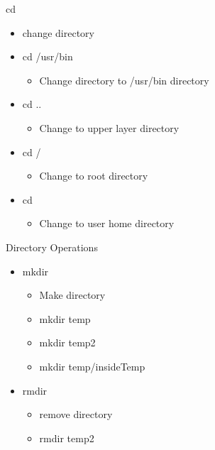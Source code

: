 \documentclass{beamer}
\begin{document}
\begin{frame}{cd}
\begin{itemize}
\item change directory
\item cd /usr/bin
\begin{itemize}
\item Change directory to /usr/bin directory
\end{itemize}
\item cd ..
\begin{itemize}
\item Change to upper layer directory
\end{itemize}
\item cd /
\begin{itemize}
\item Change to root directory
\end{itemize}
\item cd ~
\begin{itemize}
\item Change to user home directory
\end{itemize}
\end{itemize}
\end{frame}

\begin{frame}{Directory Operations}
\begin{itemize}
\item mkdir
\begin{itemize}
\item Make directory
\item mkdir temp
\item mkdir temp2
\item mkdir temp/insideTemp
\end{itemize}
\item rmdir
\begin{itemize}
\item remove directory
\item rmdir temp2
\end{itemize}
\end{itemize}
\end{frame}

\end{document}
